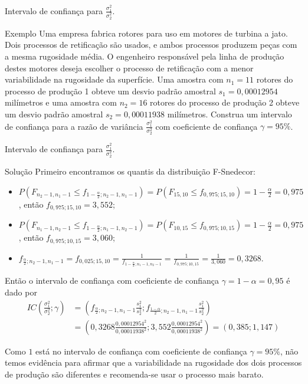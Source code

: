 \documentclass[9pt]{beamer}
\begin{document}
\begin{frame}{Intervalo de confiança para $\frac{\sigma_1^2}{\sigma_2^2}$.}
\begin{block}{Exemplo}
	Uma empresa fabrica rotores para uso em motores de turbina a jato. Dois processos de retificação são usados, e ambos processos produzem peças com a mesma rugosidade média.  O engenheiro responsável pela linha de produção destes motores deseja escolher o processo de retificação com a menor variabilidade na rugosidade da superfície. Uma amostra com $n_1 = 11$ rotores do processo de produção 1 obteve um desvio padrão amostral $s_1=0,00012954$ milímetros e uma amostra com $n_2=16$ rotores do processo de produção 2 obteve um desvio padrão amostral $s_2=0,00011938$ milímetros. Construa um intervalo de confiança para a razão de variância $\frac{\sigma_1^2}{\sigma_2^2}$ com coeficiente de confiança $\gamma = 95\%$.
\end{block}
\end{frame}

\begin{frame}{Intervalo de confiança para $\frac{\sigma_1^2}{\sigma_2^2}$.}

\footnotesize

\begin{block}{Solução}
	Primeiro encontramos os quantis da distribuição F-Snedecor:
	\begin{itemize}
		\item $P\left(F_{n_2-1, n_1-1} \leq f_{1-\frac{\alpha}{2};n_2-1, n_1-1} \right) = P\left(F_{15, 10} \leq f_{0,975;15, 10} \right) = 1-\frac{\alpha}{2} = 0,975$, então $f_{0,975;15, 10} = 3,552$;
		\item $P\left(F_{n_1-1, n_2-1} \leq f_{1-\frac{\alpha}{2};n_1-1, n_2-1} \right) = P\left(F_{10, 15} \leq f_{0,975;10, 15} \right) =1- \frac{\alpha}{2} = 0,975$, então $f_{0,975;10, 15} = 3,060$;
		\item $f_{\frac{\alpha}{2}; n_2-1, n_1-1}  = f_{0,025; 15, 10} = \frac{1}{f_{1-\frac{\alpha}{2}; n_1-1, n_2-1}} = \frac{1}{f_{0,975; 10, 15}} = \frac{1}{3,060} = 0,3268$.
	\end{itemize}

Então o intervalo de confiança com coeficiente de confiança $\gamma = 1-\alpha=0,95$ é dado por
\begin{align*}
	IC\left(\frac{\sigma_1^2}{\sigma_2^2}; \gamma\right) &= \left( f_{\frac{\alpha}{2}; n_2-1, n_1-1} \frac{s_1^2}{s_2^2}; f_{\frac{1-\alpha}{2}; n_2-1, n_1-1} \frac{s_1^2}{s_2^2}  \right)\\
	&= \left( 0,3268 \frac{0,00012954^2}{0,00011938^2}; 3,552 \frac{0,00012954^2}{0,00011938^2} \right) = (0,385; 1,147)
\end{align*}
\end{block}



Como $1$ está no intervalo de confiança com coeficiente de confiança $\gamma=95\%$, não temos evidência para afirmar que a variabilidade na rugosidade dos dois processos de produção são diferentes e recomenda-se usar o processo mais barato.

\normalsize
\end{frame}
\end{document}
